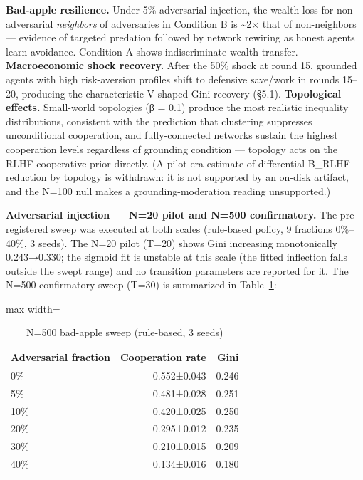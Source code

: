 
\textbf{Bad-apple resilience.} Under 5\% adversarial injection, the wealth loss for non-adversarial \textit{neighbors} of adversaries in Condition B is \textasciitilde{}2× that of non-neighbors — evidence of targeted predation followed by network rewiring as honest agents learn avoidance. Condition A shows indiscriminate wealth transfer. \textbf{Macroeconomic shock recovery.} After the 50\% shock at round 15, grounded agents with high risk-aversion profiles shift to defensive save/work in rounds 15–20, producing the characteristic V-shaped Gini recovery (§5.1). \textbf{Topological effects.} Small-world topologies (β = 0.1) produce the most realistic inequality distributions, consistent with the prediction that clustering suppresses unconditional cooperation, and fully-connected networks sustain the highest cooperation levels regardless of grounding condition — topology acts on the RLHF cooperative prior directly. (A pilot-era estimate of differential B\_RLHF reduction by topology is withdrawn: it is not supported by an on-disk artifact, and the N=100 null makes a grounding-moderation reading unsupported.)


\textbf{Adversarial injection — N=20 pilot and N=500 confirmatory.} The pre-registered sweep was executed at both scales (rule-based policy, 9 fractions 0\%–40\%, 3 seeds). The N=20 pilot (T=20) shows Gini increasing monotonically 0.243→0.330; the sigmoid fit is unstable at this scale (the fitted inflection falls outside the swept range) and no transition parameters are reported for it. The N=500 confirmatory sweep (T=30) is summarized in Table~\ref{tab:4}:


\begin{table}[H]
\centering
\caption{N=500 bad-apple sweep (rule-based, 3 seeds)}
\label{tab:4}
\footnotesize
\begin{adjustbox}{max width=\textwidth}
\begin{tabular}{lrr}
\toprule
Adversarial fraction & Cooperation rate & Gini \\
\midrule
0\% & 0.552±0.043 & 0.246 \\
5\% & 0.481±0.028 & 0.251 \\
10\% & 0.420±0.025 & 0.250 \\
20\% & 0.295±0.012 & 0.235 \\
30\% & 0.210±0.015 & 0.209 \\
40\% & 0.134±0.016 & 0.180 \\
\bottomrule
\end{tabular}
\end{adjustbox}
\end{table}

